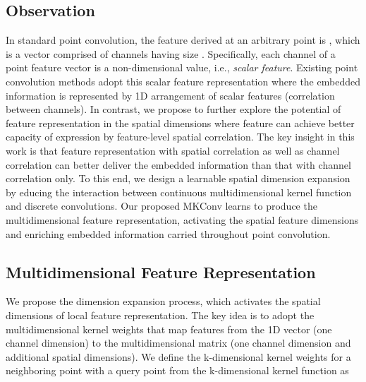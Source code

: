 \documentclass[preprint,12pt]{elsarticle}
\begin{document}
\subsection{Observation}
In standard point convolution, the feature derived at an arbitrary point  is , which is a vector comprised of channels having size . Specifically, each channel of a point feature vector is a non-dimensional value, i.e., \textit{scalar feature}. Existing point convolution methods adopt this scalar feature representation where the embedded information is represented by 1D arrangement of scalar features (correlation between channels). In contrast, we propose to further explore the potential of feature representation in the spatial dimensions where feature can achieve better capacity of expression by feature-level spatial correlation. The key insight in this work is that feature representation with spatial correlation as well as channel correlation can better deliver the embedded information than that with channel correlation only. To this end, we design a learnable spatial dimension expansion by educing the interaction between continuous multidimensional kernel function and discrete convolutions. Our proposed MKConv learns to produce the multidimensional feature representation, activating the spatial feature dimensions and enriching embedded information carried throughout point convolution. 


\subsection{Multidimensional Feature Representation}
\label{sec:fv}
We propose the dimension expansion process, which activates the spatial dimensions of local feature representation. The key idea is to adopt the multidimensional kernel weights that map features from the 1D vector (one channel dimension) to the multidimensional matrix (one channel dimension and additional spatial dimensions).
We define the k-dimensional kernel weights  for a neighboring point  with a query point  from the k-dimensional kernel function  as
\end{document}
